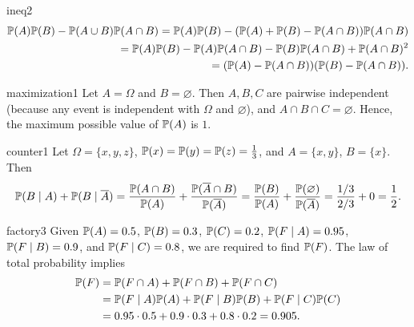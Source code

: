 \begin{sol}{ineq2}
    \begin{align*}
        \mathbb{P}(A)\mathbb{P}(B)-\mathbb{P}(A\cup B)\mathbb{P}(A\cap B)=\mathbb{P}(A)\mathbb{P}(B)-(\mathbb{P}(A)+\mathbb{P}(B)-\mathbb{P}(A\cap B))\mathbb{P}(A\cap B)\\
        =\mathbb{P}(A)\mathbb{P}(B)-\mathbb{P}(A)\mathbb{P}(A\cap B)-\mathbb{P}(B)\mathbb{P}(A\cap B)+\mathbb{P}(A\cap B)^2\\
        =(\mathbb{P}(A)-\mathbb{P}(A\cap B))(\mathbb{P}(B)-\mathbb{P}(A\cap B)).
    \end{align*}
\end{sol}

\begin{sol}{maximization1}
    Let $A=\Omega$ and $B=\varnothing$. Then $A,B,C$ are pairwise independent (because any event is independent with $\Omega$ and $\varnothing$), and $A\cap B\cap C=\varnothing$. Hence, the maximum possible value of $\mathbb{P}(A)$ is $1$.
\end{sol}

\begin{sol}{counter1}
    Let $\Omega=\{x,y,z\}$, $\mathbb{P}(x)=\mathbb{P}(y)=\mathbb{P}(z)=\frac13$, and $A=\{x,y\}$, $B=\{x\}$. Then
    \[
        \mathbb{P}(B\mid A)+\mathbb{P}(B\mid\overline{A})=\frac{\mathbb{P}(A\cap B)}{\mathbb{P}(A)}+\frac{\mathbb{P}(\overline{A}\cap B)}{\mathbb{P}(\overline{A})}=\frac{\mathbb{P}(B)}{\mathbb{P}(A)}+\frac{\mathbb{P}(\varnothing)}{\mathbb{P}(\overline{A})}=\frac{1/3}{2/3}+0=\frac12.
    \]
\end{sol}

\begin{sol}{factory3}
    Given $\mathbb{P}(A)=0.5$, $\mathbb{P}(B)=0.3$, $\mathbb{P}(C)=0.2$, $\mathbb{P}(F\mid A)=0.95$, $\mathbb{P}(F\mid B)=0.9$, and $\mathbb{P}(F\mid C)=0.8$, we are required to find $\mathbb{P}(F)$. The law of total probability implies
    \begin{align*}
        \mathbb{P}(F)&=\mathbb{P}(F\cap A)+\mathbb{P}(F\cap B)+\mathbb{P}(F\cap C)\\
        &=\mathbb{P}(F\mid A)\mathbb{P}(A)+\mathbb{P}(F\mid B)\mathbb{P}(B)+\mathbb{P}(F\mid C)\mathbb{P}(C)\\
        &=0.95\cdot0.5+0.9\cdot0.3+0.8\cdot0.2=0.905.
    \end{align*}
\end{sol}

